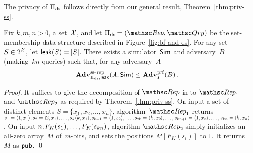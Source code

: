 The privacy of $\Pi_{\mathrm{ds}}$ follows directly from our general result, Theorem~\ref{thm:priv-ss}.
\begin{theorem}\label{thm:ds-ss}
Fix $k,m,n>0$, a set~${\cal X}$, and let $\setprim_{\mathrm{ds}}= (\Rep,
\Qry)$ be the set-membership data structure described in
Figure~\ref{fig:bf-and-ds}.  For any set~$S \in 2^{\cal X}$, let
${\sf leak}(S)=|S|$.  There exists a simulator~${\sf Sim}$ and adversary~$B$
(making~$kn$ queries) such that, for any adversary~$A$
\[
\mathrm{\mathbf{Adv}}^{\mathrm{ss\mbox{-}rep}}_{\Pi_{\mathrm{ds}},{\sf leak}}(A,{\sf Sim}) \leq  \mathbf{Adv}^{\mathrm{prf}}_{F}(B)\,.
\]
\end{theorem}
\begin{proof}
It suffices to give the decomposition of $\Rep$ in to $\Rep_1$ and $\Rep_2$ as required by Theorem~\ref{thm:priv-ss}.
On input a set of distinct elements $S=\{x_1,x_2,\ldots,x_n\}$, algorithm~$\Rep_1$ returns $s_1=\langle 1,x_1 \rangle, s_2=\langle 2,x_1 \rangle, \ldots, s_k\langle k,x_1\rangle, s_{k+1}=\langle 1,x_2\rangle, \ldots,\linebreak s_{2k}=\langle k,x_2\rangle, \ldots ,s_{kn+1}=\langle 1,x_n\rangle, \ldots, s_{kn}=\langle k,x_n \rangle$.  On input $n,F_K(s_1),\ldots,\linebreak F_K(s_{kn})$, algorithm $\Rep_2$ simply initializes an all-zero array~$M$ of~$m$-bits, and sets the positions $M[F_K(s_i)]$ to 1.  It returns~$M$ as ${\sf pub}$. \hfill\qed
\end{proof}


